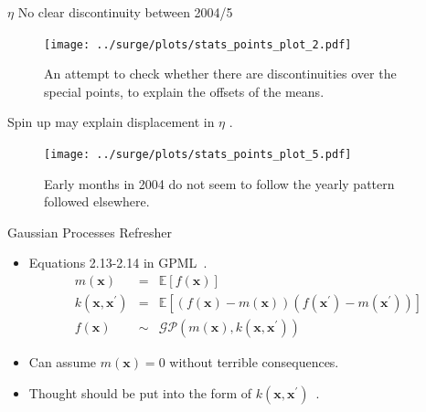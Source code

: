 \documentclass[usenames, dvipsnames]{beamer}
\begin{document}
\begin{frame}{$\eta$ No clear discontinuity between 2004/5  }
\vspace{-20pt}
\begin{figure}[htb!]
    \centering
    \texttt{[image: ../surge/plots/stats\_points\_plot\_2.pdf]}
    \vspace{-7pt}
    \caption{An attempt to check whether there are discontinuities
     over the special points, to explain the offsets of the means.}
\end{figure}
\end{frame}

\begin{frame}{Spin up may explain displacement in $\eta$ . }
\vspace{-20pt}
\begin{figure}[htb!]
    \centering
    \texttt{[image: ../surge/plots/stats\_points\_plot\_5.pdf]}
    \vspace{-7pt}
    \caption{Early months in 2004 do not seem to follow the yearly pattern followed elsewhere.}
\end{figure}
\end{frame}


\begin{frame}{Gaussian Processes Refresher}
\vspace{-20pt}
\begin{itemize}
\item Equations 2.13-2.14 in GPML~\cite{williams2006gaussian}.
\begin{align}
m(\mathbf{x})&=&\mathbb{E}[f(\mathbf{x})] %
\\
k\left(\mathbf{x}, \mathbf{x}^{\prime}\right)&=&\mathbb{E}
\left[(f(\mathbf{x})-m(\mathbf{x}))\left(f\left(\mathbf{x}^{\prime}\right)
-m\left(\mathbf{x}^{\prime}\right)\right)\right]
\\
f(\mathbf{x})& \sim& \mathcal{G} \mathcal{P}\left(m(\mathbf{x}),
 k\left(\mathbf{x}, \mathbf{x}^{\prime}\right)\right)%
\end{align}
\item Can assume $m(\mathbf{x})=0$ without terrible consequences.
 \item Thought should be put into the form of $k\left(\mathbf{x},
  \mathbf{x}^{\prime}\right)$~\cite{duvenaud2014automatic}.
\end{itemize}
\end{frame}
\end{document}
